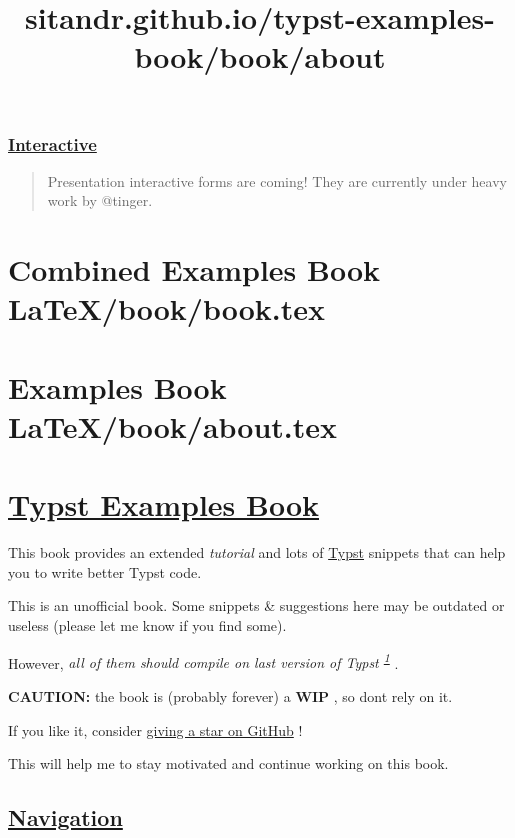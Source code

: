 \subsubsection{\texorpdfstring{\hyperref[interactive]{Interactive}}{Interactive}}\label{interactive}

\begin{quote}
Presentation interactive forms are coming! They are currently under
heavy work by @tinger.
\end{quote}






\section{Combined Examples Book LaTeX/book/book.tex}
\section{Examples Book LaTeX/book/about.tex}
\title{sitandr.github.io/typst-examples-book/book/about}

\section{\texorpdfstring{\hyperref[typst-examples-book]{Typst Examples
Book}}{Typst Examples Book}}\label{typst-examples-book}

This book provides an extended \emph{tutorial} and lots of
\href{https://github.com/typst/typst}{Typst} snippets that can help you
to write better Typst code.

This is an unofficial book. Some snippets \& suggestions here may be
outdated or useless (please let me know if you find some).

However, \emph{all of them should compile on last version of Typst
\textsuperscript{\hyperref[1]{1}}} .

\textbf{CAUTION:} the book is (probably forever) a \textbf{WIP} , so
don\textquotesingle t rely on it.

If you like it, consider
\href{https://github.com/sitandr/typst-examples-book}{giving a star on
GitHub} !

This will help me to stay motivated and continue working on this book.

\subsection{\texorpdfstring{\hyperref[navigation]{Navigation}}{Navigation}}\label{navigation}

